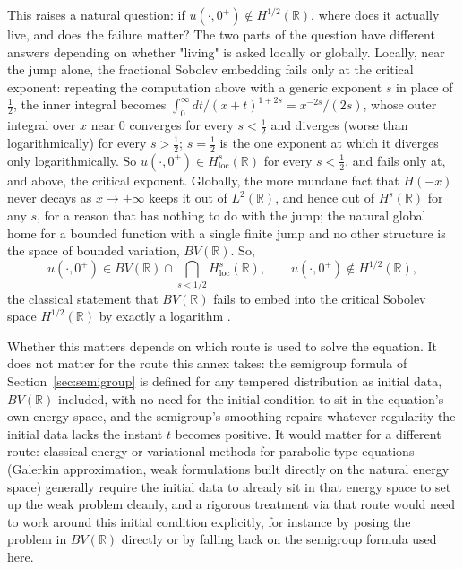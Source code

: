 \documentclass{article}
\begin{document}
This raises a natural question: if $u(\cdot,0^+)\notin H^{1/2}(\mathbb{R})$,
where does it actually live, and does the failure matter? The two parts of
the question have different answers depending on whether "living" is asked
locally or globally. Locally, near the jump alone, the fractional Sobolev
embedding fails only at the critical exponent: repeating the
computation above with a generic exponent $s$ in place of $\tfrac12$, the
inner integral becomes $\int_0^\infty dt/(x+t)^{1+2s} = x^{-2s}/(2s)$, whose
outer integral over $x$ near $0$ converges for every $s<\tfrac12$ and
diverges (worse than logarithmically) for every $s>\tfrac12$; $s=\tfrac12$
is the one exponent at which it diverges only logarithmically. So
$u(\cdot,0^+)\in H^s_{\mathrm{loc}}(\mathbb{R})$ for every $s<\tfrac12$, and
fails only at, and above, the critical exponent. Globally, the more mundane
fact that $H(-x)$ never decays as $x\to\pm\infty$ keeps it out of
$L^2(\mathbb{R})$, and hence out of $H^s(\mathbb{R})$ for any $s$, for a
reason that has nothing to do with the jump; the natural global home for a
bounded function with a single finite jump and no other structure is the
space of bounded variation, $BV(\mathbb{R})$. So,
\begin{equation*}
u(\cdot,0^+)\in BV(\mathbb{R})\cap\!\!\bigcap_{s<1/2}\!\!H^s_{\mathrm{loc}}(\mathbb{R}),
\qquad u(\cdot,0^+)\notin H^{1/2}(\mathbb{R}),
\end{equation*}
the classical statement that $BV(\mathbb{R})$ fails to embed into the
critical Sobolev space $H^{1/2}(\mathbb{R})$ by exactly a logarithm
\citep{dinezza2012hitchhikers}.

Whether this matters depends on which route is used to solve the equation.
It does not matter for the route this annex takes: the semigroup formula
of Section~\ref{sec:semigroup} is defined for any tempered distribution as
initial data, $BV(\mathbb{R})$ included, with no need for the initial
condition to sit in the equation's own energy space, and the semigroup's
smoothing repairs whatever regularity the initial data lacks the instant
$t$ becomes positive. It would matter for a different route: classical
energy or variational methods for parabolic-type equations (Galerkin
approximation, weak formulations built directly on the natural energy
space) generally require the initial data to already sit in that energy
space to set up the weak problem cleanly, and a rigorous treatment via that
route would need to work around this initial condition explicitly, for
instance by posing the problem in $BV(\mathbb{R})$ directly or by falling
back on the semigroup formula used here.
\end{document}
